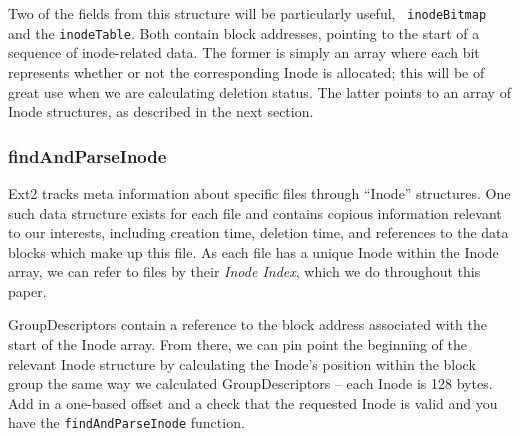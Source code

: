\documentclass[nocopyrightspace]{sigplanconf}
\begin{document}
Two of the fields from this structure will be particularly useful, {\tt
inodeBitmap} and the {\tt inodeTable}. Both contain block addresses, pointing
to the start of a sequence of inode-related data. The former is simply an
array where each bit represents whether or not the corresponding Inode is
allocated; this will be of great use when we are calculating deletion status.
The latter points to an array of Inode structures, as described in the next
section.

\subsubsection{findAndParseInode}

Ext2 tracks meta information about specific files through ``Inode''
structures. One such data structure exists for each file and contains copious
information relevant to our interests, including creation time, deletion time,
and references to the data blocks which make up this file. As each file has a
unique Inode within the Inode array, we can refer to files by their {\it Inode
Index}, which we do throughout this paper.

GroupDescriptors contain a reference to the block address associated with the
start of the Inode array. From there, we can pin point the beginning of the
relevant Inode structure by calculating the Inode's position within the block
group the same way we calculated GroupDescriptors -- each Inode is 128 bytes.
Add in a one-based offset and a check that the requested Inode is valid and
you have the {\tt findAndParseInode} function.
\end{document}
